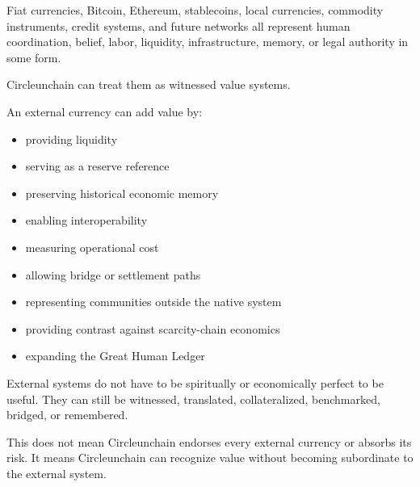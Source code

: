 ﻿\documentclass[12pt]{article}
\begin{document}
Fiat currencies, Bitcoin, Ethereum, stablecoins, local currencies, commodity instruments, credit systems, and future networks all represent human coordination, belief, labor, liquidity, infrastructure, memory, or legal authority in some form.

Circleunchain can treat them as witnessed value systems.

An external currency can add value by:

\begin{itemize}
  \item providing liquidity
\end{itemize}
\begin{itemize}
  \item serving as a reserve reference
\end{itemize}
\begin{itemize}
  \item preserving historical economic memory
\end{itemize}
\begin{itemize}
  \item enabling interoperability
\end{itemize}
\begin{itemize}
  \item measuring operational cost
\end{itemize}
\begin{itemize}
  \item allowing bridge or settlement paths
\end{itemize}
\begin{itemize}
  \item representing communities outside the native system
\end{itemize}
\begin{itemize}
  \item providing contrast against scarcity-chain economics
\end{itemize}
\begin{itemize}
  \item expanding the Great Human Ledger
\end{itemize}

External systems do not have to be spiritually or economically perfect to be useful. They can still be witnessed, translated, collateralized, benchmarked, bridged, or remembered.

This does not mean Circleunchain endorses every external currency or absorbs its risk. It means Circleunchain can recognize value without becoming subordinate to the external system.
\end{document}
